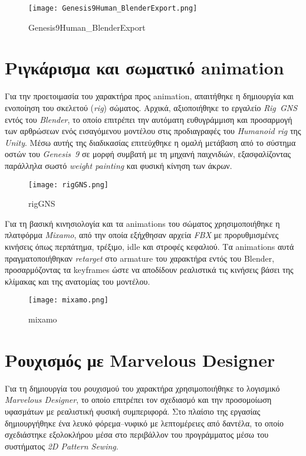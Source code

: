 \begin{figure}[H]
    \centering
    \texttt{[image: Genesis9Human\_BlenderExport.png]}
    \caption{Genesis9Human_BlenderExport}
    \label{fig:placeholder}
\end{figure}
\section{Ριγκάρισμα και σωματικό animation}
Για την προετοιμασία του χαρακτήρα προς animation, απαιτήθηκε η δημιουργία και ενοποίηση του 
σκελετού (\textit{rig}) σώματος. Αρχικά, αξιοποιήθηκε το εργαλείο \textit{Rig~GNS} 
εντός του \textit{Blender}, το οποίο επιτρέπει την αυτόματη ευθυγράμμιση και προσαρμογή 
των αρθρώσεων ενός εισαγόμενου μοντέλου στις προδιαγραφές του \textit{Humanoid rig} 
της \textit{Unity}. Μέσω αυτής της διαδικασίας επιτεύχθηκε η ομαλή μετάβαση 
από το σύστημα οστών του \textit{Genesis~9} σε μορφή συμβατή με τη μηχανή παιχνιδιών, 
εξασφαλίζοντας παράλληλα σωστό \textit{weight painting} και φυσική κίνηση των άκρων.

\begin{figure}[H]
    \centering
    \texttt{[image: rigGNS.png]}
    \caption{rigGNS}
    \label{fig:placeholder}
\end{figure}


Για τη βασική κινησιολογία και τα animations του σώματος χρησιμοποιήθηκε η πλατφόρμα 
\textit{Mixamo}, από την οποία εξήχθησαν αρχεία \textit{FBX} με προρυθμισμένες κινήσεις 
όπως περπάτημα, τρέξιμο, idle και στροφές κεφαλιού. 
Τα animations αυτά πραγματοποιήθηκαν \textit{retarget} στο armature του χαρακτήρα 
εντός του Blender, προσαρμόζοντας τα keyframes ώστε να αποδίδουν ρεαλιστικά τις κινήσεις 
βάσει της κλίμακας και της ανατομίας του μοντέλου.

\begin{figure}[H]
    \centering
    \texttt{[image: mixamo.png]}
    \caption{mixamo}
    \label{fig:placeholder}
\end{figure}




\section{Ρουχισμός με Marvelous Designer}
Για τη δημιουργία του ρουχισμού του χαρακτήρα χρησιμοποιήθηκε το λογισμικό 
\textit{Marvelous Designer}, το οποίο επιτρέπει τον σχεδιασμό και την προσομοίωση 
υφασμάτων με ρεαλιστική φυσική συμπεριφορά. 
Στο πλαίσιο της εργασίας δημιουργήθηκε ένα λευκό φόρεμα--νυφικό με λεπτομέρειες από δαντέλα, 
το οποίο σχεδιάστηκε εξολοκλήρου μέσα στο περιβάλλον του προγράμματος 
μέσω του συστήματος \textit{2D Pattern Sewing}.

